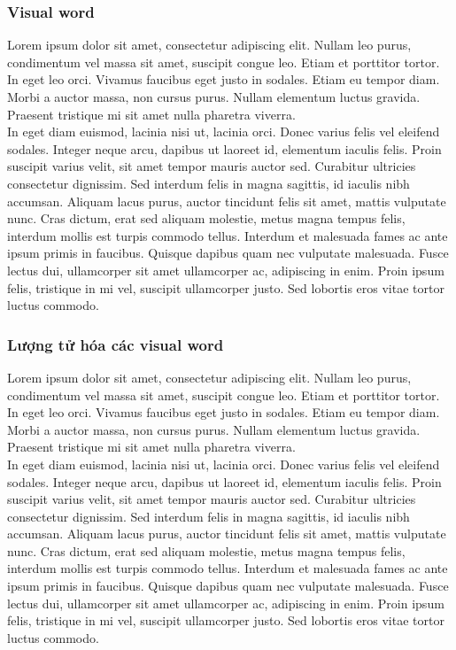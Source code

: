    \subsubsection{Visual word}
Lorem ipsum dolor sit amet, consectetur adipiscing elit. Nullam leo purus, condimentum vel massa sit amet, suscipit congue leo. Etiam et porttitor tortor. In eget leo orci. Vivamus faucibus eget justo in sodales. Etiam eu tempor diam. Morbi a auctor massa, non cursus purus. Nullam elementum luctus gravida. Praesent tristique mi sit amet nulla pharetra viverra.\\

In eget diam euismod, lacinia nisi ut, lacinia orci. Donec varius felis vel eleifend sodales. Integer neque arcu, dapibus ut laoreet id, elementum iaculis felis. Proin suscipit varius velit, sit amet tempor mauris auctor sed. Curabitur ultricies consectetur dignissim. Sed interdum felis in magna sagittis, id iaculis nibh accumsan. Aliquam lacus purus, auctor tincidunt felis sit amet, mattis vulputate nunc. Cras dictum, erat sed aliquam molestie, metus magna tempus felis, interdum mollis est turpis commodo tellus. Interdum et malesuada fames ac ante ipsum primis in faucibus. Quisque dapibus quam nec vulputate malesuada. Fusce lectus dui, ullamcorper sit amet ullamcorper ac, adipiscing in enim. Proin ipsum felis, tristique in mi vel, suscipit ullamcorper justo. Sed lobortis eros vitae tortor luctus commodo.\\
   \subsubsection{Lượng tử hóa các visual word}
Lorem ipsum dolor sit amet, consectetur adipiscing elit. Nullam leo purus, condimentum vel massa sit amet, suscipit congue leo. Etiam et porttitor tortor. In eget leo orci. Vivamus faucibus eget justo in sodales. Etiam eu tempor diam. Morbi a auctor massa, non cursus purus. Nullam elementum luctus gravida. Praesent tristique mi sit amet nulla pharetra viverra.\\

In eget diam euismod, lacinia nisi ut, lacinia orci. Donec varius felis vel eleifend sodales. Integer neque arcu, dapibus ut laoreet id, elementum iaculis felis. Proin suscipit varius velit, sit amet tempor mauris auctor sed. Curabitur ultricies consectetur dignissim. Sed interdum felis in magna sagittis, id iaculis nibh accumsan. Aliquam lacus purus, auctor tincidunt felis sit amet, mattis vulputate nunc. Cras dictum, erat sed aliquam molestie, metus magna tempus felis, interdum mollis est turpis commodo tellus. Interdum et malesuada fames ac ante ipsum primis in faucibus. Quisque dapibus quam nec vulputate malesuada. Fusce lectus dui, ullamcorper sit amet ullamcorper ac, adipiscing in enim. Proin ipsum felis, tristique in mi vel, suscipit ullamcorper justo. Sed lobortis eros vitae tortor luctus commodo.\\
